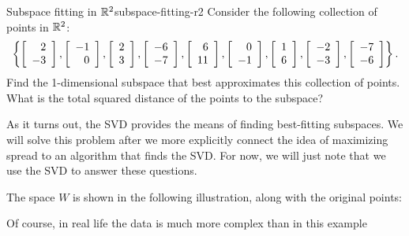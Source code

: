 \documentclass{ximera}
\begin{document}
\begin{example}{Subspace fitting in $\R^2$}{subspace-fitting-r2}
  Consider the following collection of points in $\R^2$:
  \begin{equation*}
    \set{
      \startmat{r}  2 \\ -3 \stopmat,
      \startmat{r} -1 \\  0 \stopmat,
      \startmat{r}  2 \\  3 \stopmat,
      \startmat{r} -6 \\ -7 \stopmat,
      \startmat{r}  6 \\ 11 \stopmat,
      \startmat{r}  0 \\ -1 \stopmat,
      \startmat{r}  1 \\  6 \stopmat,
      \startmat{r} -2 \\ -3 \stopmat,
      \startmat{r} -7 \\ -6 \stopmat
    }.
  \end{equation*}
  Find the 1-dimensional subspace that best approximates this
  collection of points. What is the total squared distance of the
  points to the subspace?

  As it turns out, the SVD provides the means of finding best-fitting subspaces. We will solve this problem after we more explicitly connect the idea of maximizing spread to an algorithm that finds the SVD. For now, we will just note that we use the SVD to answer these questions.


  The space $W$ is shown in the following illustration, along with the
  original points:
  \begin{center}
  \end{center}
  Of course, in real life the data is much more complex than in this example

\end{example}
\end{document}
